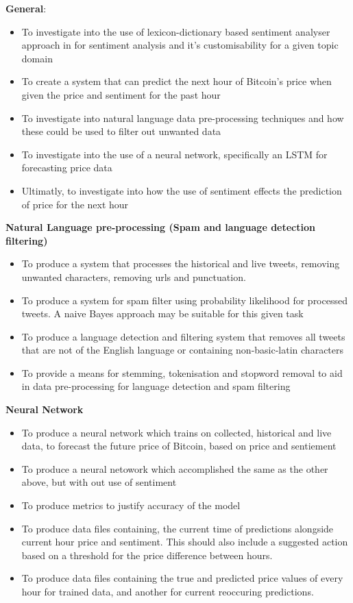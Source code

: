 \documentclass[oneside, 10pt]{article}
\begin{document}
		\textbf{General}:
		\begin{itemize}
			\item To investigate into the use of lexicon-dictionary based sentiment analyser approach in for sentiment analysis and it's customisability for a given topic domain
			\item To create a system that can predict the next hour of Bitcoin’s price when given the price and sentiment for the past hour
			\item To investigate into natural language data pre-processing techniques and how these could be used to filter out unwanted data
			\item To investigate into the use of a neural network, specifically an LSTM for forecasting price data
			\item Ultimatly, to investigate into how the use of sentiment effects the prediction of price for the next hour
			\newline
		\end{itemize}
		
	
		\textbf{Natural Language pre-processing (Spam and language detection filtering)}
		\begin{itemize}
			\item To produce a system that processes the historical and live tweets, removing unwanted characters, removing urls and punctuation.
			\item To produce a system for spam filter using probability likelihood for processed tweets. A naive Bayes approach may be suitable for this given task
			\item To produce a language detection and filtering system that removes all tweets that are not of the English language or containing non-basic-latin characters
			\item To provide a means for stemming, tokenisation and stopword removal to aid in data pre-processing for language detection and spam filtering
			\newline
		\end{itemize}
		
		\textbf{Neural Network}
		\begin{itemize}
			\item To produce a neural network which trains on collected, historical and live data, to forecast the future price of Bitcoin, based on price and sentiement
			\item To produce a neural netowork which accomplished the same as the other above, but with out use of sentiment
			\item To produce metrics to justify accuracy of the model
			\item To produce data files containing, the current time of predictions alongside current hour price and sentiment. This should also include a suggested action based on a threshold for the price difference between hours. 
			\item To produce data files containing the true and predicted price values of every hour for trained data, and another for current reoccuring predictions.
			\newline
		\end{itemize}
		
\end{document}
